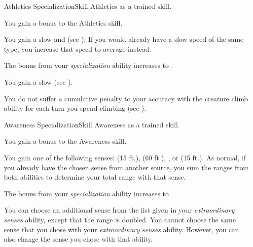   \begin{feat}{Athletics Specialization}{Skill}
    \featpre Athletics as a trained skill.

     You gain a  bonus to the Athletics skill.

     You gain a slow  and  (see ).
    If you would already have a slow speed of the same type, you increase that speed to average instead.

     The bonus from your \textit{specialization} ability increases to .

     You gain a slow  (see ).

     You do not suffer a cumulative penalty to your accuracy with the creature climb ability for each turn you spend climbing (see ).
  \end{feat}

  \begin{feat}{Awareness Specialization}{Skill}
    \featpre Awareness as a trained skill.

     You gain a  bonus to the Awareness skill.

     You gain one of the following senses:  (15 ft.),  (60 ft.), , or  (15 ft.).
    As normal, if you already have the chosen sense from another source, you sum the ranges from both abilities to determine your total range with that sense.

     The bonus from your \textit{specialization} ability increases to .

     You can choose an additional sense from the list given in your \textit{extraordinary senses} ability, except that the range is doubled.
    You cannot choose the same sense that you chose with your \textit{extraordinary senses} ability.
    However, you can also change the sense you chose with that ability.
  \end{feat}

